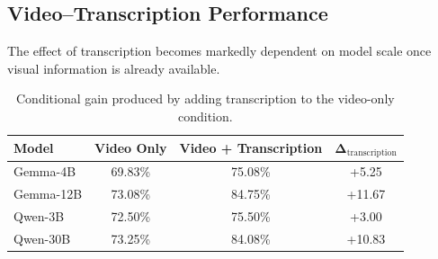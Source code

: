 \subsection*{Video--Transcription Performance}
\label{subsec:video_transcription}
The effect of transcription becomes markedly dependent on model scale once visual information is already available.
\begin{table}[ht]
    \centering
    \small
    \begin{tabular}{lccc}
        \hline
        \textbf{Model} &
        \textbf{Video Only} &
        \textbf{Video + Transcription} &
        $\boldsymbol{\Delta_{\mathrm{transcription}}}$ \\
        \hline
        Gemma-4B    & 69.83\% & 75.08\% & +5.25 \\
        Gemma-12B & 73.08\% & 84.75\% & +11.67 \\
        Qwen-3B & 72.50\% & 75.50\% & +3.00 \\
        Qwen-30B & 73.25\% & 84.08\% & +10.83 \\
        \hline
    \end{tabular}
    \caption{Conditional gain produced by adding transcription to the video-only condition.}
    \label{tab:transcription_video_gain}
\end{table}
\begin{table}[ht]
    \centering
    \small
    \caption{Exact McNemar comparisons between the video-only condition and the video-plus-transcription condition.}
    \label{tab:mcnemar_video_transcription}
\end{table}
